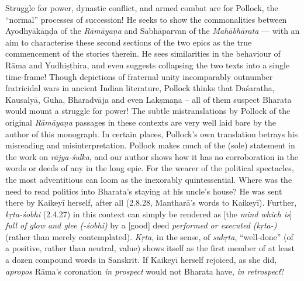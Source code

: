 Struggle for power, dynastic conflict, and armed combat are for Pollock, the ``normal'' processes of succession! He seeks to show the commonalities between Ayodhyākāṇḍa of the {\sl Rāmāyaṇa} and Sabhāparvan of the {\sl Mahābhārata} --- with an aim to characterise these second sections of the two epics as the true commencement of the stories therein. He sees similarities in the behaviour of Rāma and Yudhiṣṭhira, and even suggests collapsing the two texts into a single time-frame! Though depictions of fraternal unity incomparably outnumber fratricidal wars in ancient Indian literature, Pollock thinks that Daśaratha, Kausalyā, Guha, Bharadvāja and even Lakṣmaṇa -- all of them suspect Bharata would mount a struggle for power! The subtle mistranslations by Pollock of the original {\sl Rāmāyaṇa} passages in these contexts are very well laid bare by the author of this monograph. In certain places, Pollock's own translation betrays his misreading and misinterpretation. Pollock makes much of the (sole) statement in the work on {\sl rājya-śulka}, and our author shows how it has no corroboration in the words or deeds of any in the long epic. For the wearer of the political spectacles, the most adventitious can loom as the inexorably quintessential. Where was the need to read politics into Bharata's staying at his uncle's house? He was sent there by Kaikeyī herself, after all (2.8.28, Mantharā's words to Kaikeyī). Further, {\sl kṛta-śobhi} (2.4.27) in this context can simply be rendered as [the {\sl mind which is}] {\sl full of glow and glee (-śobhi)} by a [good] deed {\sl performed or executed (kṛta-)} (rather than merely contemplated). {\sl Kṛta}, in the sense, of {\sl sukṛta}, ``well-done'' (of a positive, rather than neutral, value) shows itself as the first member of at least a dozen compound words in Sanskrit. If Kaikeyī herself rejoiced, as she did, {\sl apropos} Rāma's coronation {\sl in prospect} would not Bharata have, {\sl in retrospect}?

